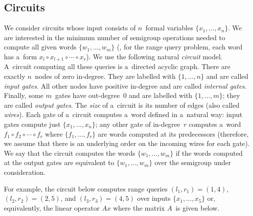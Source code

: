 \documentclass{toc}
\begin{document}
\subsection{Circuits}\label{subsec:circuits}
We consider circuits whose input consists of $n$~formal variables
$\{x_1, \dotsc, x_n\}$. We are interested in the minimum number of semigroup
operations needed to compute all given words $\{w_1, \dotsc, w_m\}$ (\eg, for
%
%
the range query problem,
each word has a~form $x_l\circ x_{l+1}\circ \dotsb \circ x_r$).
We use
the following natural \emph{circuit} model. A~circuit computing all these queries
is a~directed acyclic graph. There are exactly $n$~nodes of zero in-degree. They
are labelled with $\{1, \dotsc, n\}$ and are called \emph{input gates}. All
other nodes have positive in-degree and are called
%
%
\emph{internal gates}.
%
%
Finally, some
$m$~gates have out-degree~0 and are labelled with $\{1, \dotsc, m\}$; they are
called \emph{output gates}.
The
\emph{size} of a~circuit is its number of edges (also called \emph{wires}). Each
gate of a~circuit computes a~word defined in a~natural way: input gates compute
just $\{x_1, \dotsc, x_n\}$; any other gate of in-degree~$r$ computes a~word
$f_1 \circ f_2 \circ \dotsb \circ f_r$ where $\{f_1, \dotsc, f_r\}$ are words
computed at its predecessors (therefore, we assume that there is an underlying
order on the incoming wires for each gate). We say that the circuit computes the
words $\{w_1, \dotsc, w_m\}$ if the words computed at the output gates are
equivalent to $\{w_1, \dotsc, w_m\}$ over the %
semigroup under consideration.  %

For example, the circuit below computes range queries
$(l_1,r_1)=(1,4)$,
$(l_2,r_2)=(2,5)$, and
$(l_3,r_3)=(4,5)$
over inputs $\{x_1, \dotsc, x_5\}$ or, equivalently, the
linear operator $Ax$ where the matrix $A$~is given below.

\vspace{5mm}
\begin{center}
\end{center}
\vspace{5mm}
\end{document}
